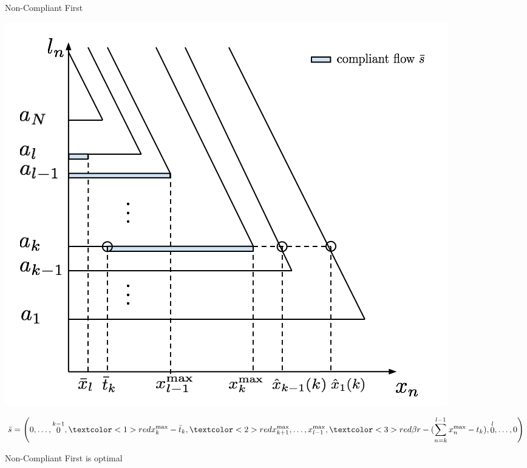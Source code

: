 \documentclass[english, smaller]{beamer}
\theoremstyle{plain}
\theoremstyle{definition}
\theoremstyle{plain}
\theoremstyle{plain}
\begin{document}
\begin{frame}{Non-Compliant First}

\begin{center}
\includegraphics[scale=0.25]{../../figures/presentation/optimal_stackelberg3.png}
\end{center}

\small
\begin{align*}
\bar{s} = 
\left( 
0, \dots, \stackrel{k-1}{0}, 
\textcolor<1>{red}{ x_k^{\max} - \bar{t}_k}, 
\textcolor<2>{red}{x_{k+1}^{\max}, \dots, x_{l-1}^{\max}}, 
\textcolor<3>{red}{\beta r - (\sum_{n = k}^{l-1}x_n^{\max} - t_k)}, 
\stackrel{l}{0}, \dots, 0
\right)
\end{align*}


\end{frame}



\begin{frame}{Non-Compliant First is optimal}




\end{frame}
\end{document}
